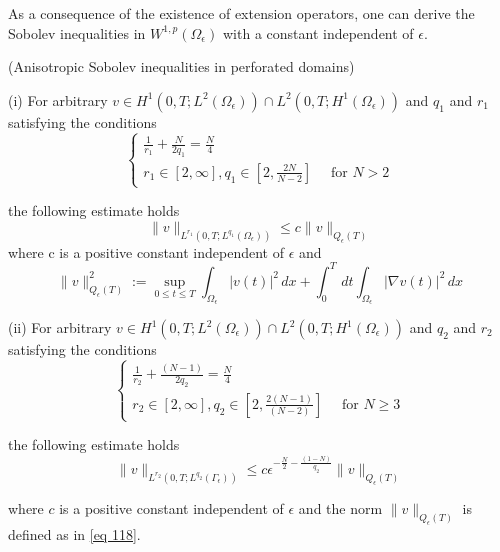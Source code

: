 As a consequence of the existence of extension operators, one can derive the Sobolev inequalities in $W^{1, p}\left(\Omega_{\epsilon}\right)$ with a constant independent of $\epsilon$.

\begin{lemma} (Anisotropic Sobolev inequalities in perforated domains)

(i) For arbitrary $v \in H^{1}\left(0, T ; L^{2}\left(\Omega_{\epsilon}\right)\right) \cap L^{2}\left(0, T ; H^{1}\left(\Omega_{\epsilon}\right)\right)$ and $q_{1}$ and $r_{1}$ satisfying the conditions
\begin{equation}
  \left\{\begin{array}{l}
\frac{1}{r_{1}}+\frac{N}{2 q_{1}}=\frac{N}{4} \\
r_{1} \in[2, \infty], q_{1} \in\left[2, \frac{2 N}{N-2}\right] \quad \text { for } N>2
\end{array}\right.
\label{eq 116}\end{equation}

the following estimate holds
\begin{equation}
  \|v\|_{L^{r_{1}}\left(0, T ; L^{q_{1}}\left(\Omega_{\epsilon}\right)\right)} \leq c\|v\|_{Q_{\epsilon}(T)}
\label{eq 117}\end{equation}
where $\mathrm{c}$ is a positive constant independent of $\epsilon$ and
\begin{equation}
  \|v\|_{Q_{\epsilon}(T)}^{2}:=\sup _{0 \leq t \leq T} \int_{\Omega_{\epsilon}}|v(t)|^{2} \, d  x+\int_{0}^{T} \, d  t \int_{\Omega_{\epsilon}}|\nabla v(t)|^{2} \, d  x
\label{eq 118}\end{equation}


(ii) For arbitrary $v \in H^{1}\left(0, T ; L^{2}\left(\Omega_{\epsilon}\right)\right) \cap L^{2}\left(0, T ; H^{1}\left(\Omega_{\epsilon}\right)\right)$ and $q_{2}$ and $r_{2}$ satisfying the conditions
\begin{equation}
  \left\{\begin{array}{l}
\frac{1}{r_{2}}+\frac{(N-1)}{2 q_{2}}=\frac{N}{4} \\
r_{2} \in[2, \infty], q_{2} \in\left[2, \frac{2(N-1)}{(N-2)}\right] \quad \text { for } N \geq 3
\end{array}\right.
\label{eq 119}\end{equation}


the following estimate holds
\begin{equation}
  \|v\|_{L^{r_{2}}\left(0, T ; L^{q_{2}}\left(\Gamma_{\epsilon}\right)\right)} \leq c \epsilon^{-\frac{N}{2}-\frac{(1-N)}{q_{2}}}\|v\|_{Q_{\epsilon}(T)}
\label{eq 120}\end{equation}


where $c$ is a positive constant independent of $\epsilon$ and the norm $\|v\|_{Q_{\epsilon}(T)}$ is defined as in \eqref{eq 118}.
\label{lemma 7.3}\end{lemma}
